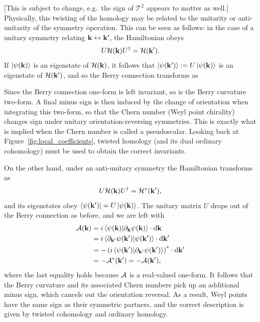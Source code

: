 {\color{red}
[This is subject to change, e.g.\ the sign of $\mathcal{T}^2$ appears to matter as well.] Physically, this twisting of the homology may be related to the unitarity or anti-unitarity of the symmetry operation. This can be seen as follows: in the case of a unitary symmetry relating $\vb{k}\leftrightarrow\vb{k}'$, the Hamiltonian obeys
\begin{equation*}
	U\mathcal{H}(\vb{k})U^\dag = \mathcal{H}(\vb{k}').
\end{equation*}
If $\ket{\psi(\vb{k})}$ is an eigenstate of $\mathcal{H}(\vb{k})$, it follows that $\ket{\psi(\vb{k}')}:=U\ket{\psi(\vb{k})}$ is an eigenstate of $\mathcal{H}(\vb{k}')$, and so the Berry connection transforms as
Since the Berry connection one-form is left invariant, so is the Berry curvature two-form. A final minus sign is then induced by the change of orientation when integrating this two-form, so that the Chern number (Weyl point chirality) changes sign under unitary orientation-reversing symmetries. This is exactly what is implied when the Chern number is called a pseudoscalar. Looking back at Figure~\ref{fig:local_coefficients}, twisted homology (and its dual ordinary cohomology) must be used to obtain the correct invariants.

On the other hand, under an anti-unitary symmetry the Hamiltonian transforms as
\begin{equation*}
	U\mathcal{H}(\vb{k})U^\dag = \mathcal{H}^*(\vb{k}'),
\end{equation*}
and its eigenstates obey $\bra{\psi(\vb{k}')} = U\ket{\psi(\vb{k})}$. The unitary matrix $U$ drops out of the Berry connection as before, and we are left with
\begin{align*}
	\mathcal{A}(\vb{k}) &= i\braket{\psi(\vb{k}) | \partial_{\vb{k}}\psi(\vb{k})}\cdot\dd{\vb{k}} \\
		&= i\braket{\partial_{\vb{k}'}\psi(\vb{k}') | \psi(\vb{k}')}\cdot\dd{\vb{k}'} \\
		&= -\left(i\braket{\psi(\vb{k}') | \partial_{\vb{k}'}\psi(\vb{k}')}\right)^*\cdot\dd{\vb{k}'} \\
		&= -\mathcal{A}^*(\vb{k}') = -\mathcal{A}(\vb{k}'),
\end{align*}
where the last equality holds because $\mathcal{A}$ is a real-valued one-form. It follows that the Berry curvature and its associated Chern numbers pick up an additional minus sign, which cancels out the orientation reversal. As a result, Weyl points have the same sign as their symmetric partners, and the correct description is given by twisted cohomology and ordinary homology.
}

